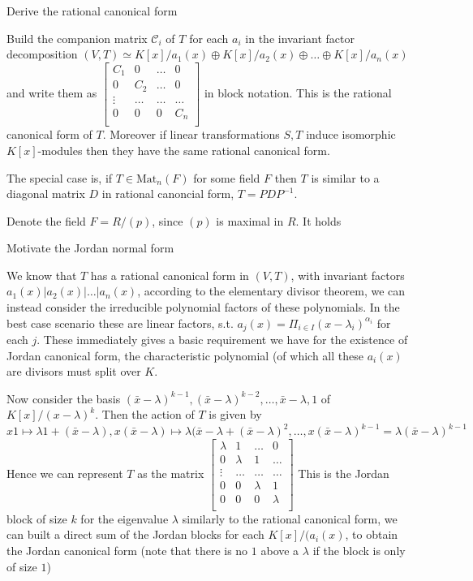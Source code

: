 Derive the rational canonical form

Build the companion matrix \(\mathcal{C}_i\) of \(T\) for each \(a_i\) in the invariant factor decomposition
\((V, T) \simeq K[x]/a_1(x) \oplus K[x]/a_2(x) \oplus \dots \oplus K[x]/a_n(x)\)
and write them as 
\(
\begin{bmatrix}
C_1 & 0 & \dots & 0 \\ 
0 & C_2 & \dots & 0 \\ 
\vdots & \dots & \dots & \dots \\
0 & 0 & 0 & C_n \\
\end{bmatrix}
\)
in block notation.
This is the rational canonical form of \(T\).
Moreover if linear transformations \(S, T\) induce isomorphic \(K[x]\)-modules then they have the same
rational canonical form.

The special case is, if \(T \in \text{Mat}_{n}(F)\) for some field \(F\) then \(T\) is similar to a diagonal matrix \(D\)
in rational canoncial form, \(T = P D P^{-1} \).



Denote the field \(F = R/(p)\), since \((p)\) is maximal in \(R\).
It holds


Motivate the Jordan normal form

We know that \(T\) has a rational canonical form in \((V, T)\), with invariant factors \(a_1(x) | a_2(x) | \dots | a_n(x)\),
according to the elementary divisor theorem, we can instead consider the irreducible polynomial factors of these polynomials.
In the best case scenario these are linear factors, s.t. \(a_j(x) = \Pi_{i \in I}(x - \lambda_i)^{\alpha_i}\) for each \(j\).
These immediately gives a basic requirement we have for the existence of Jordan canonical form, the characteristic polynomial
(of which all these \(a_i(x)\) are divisors\) must split over \(K\).

Now consider the basis \((\bar{x} - \lambda)^{k-1}, (\bar{x} - \lambda)^{k-2}, \dots, \bar{x} - \lambda, 1\) of \(K[x]/(x - \lambda)^k\).
Then the action of \(T\) is given by 
\(x 1 \mapsto \lambda 1 + (\bar{x} - \lambda), x (\bar{x} - \lambda) \mapsto \lambda(\bar{x} - \lambda + (\bar{x} - \lambda)^2, \dots, x (\bar{x} - \lambda)^{k-1} = \lambda (\bar{x} - \lambda)^{k-1}\)
Hence we can represent \(T\) as the matrix 
\(
\begin{bmatrix}
\lambda & 1 & \dots & 0 \\ 
0 & \lambda & 1 & \dots \\ 
\vdots & \dots & \dots & \dots \\
0 & 0 & \lambda & 1 \\
0 & 0 & 0 & \lambda \\
\end{bmatrix}
\)
This is the Jordan block of size \(k\) for the eigenvalue \(\lambda\) similarly to the rational canonical form,
we can built a direct sum of the Jordan blocks for each \(K[x]/(a_i(x)\),
to obtain the Jordan canonical form (note that there is no \(1\) above a \(\lambda\) if the block is only of size \(1\))

